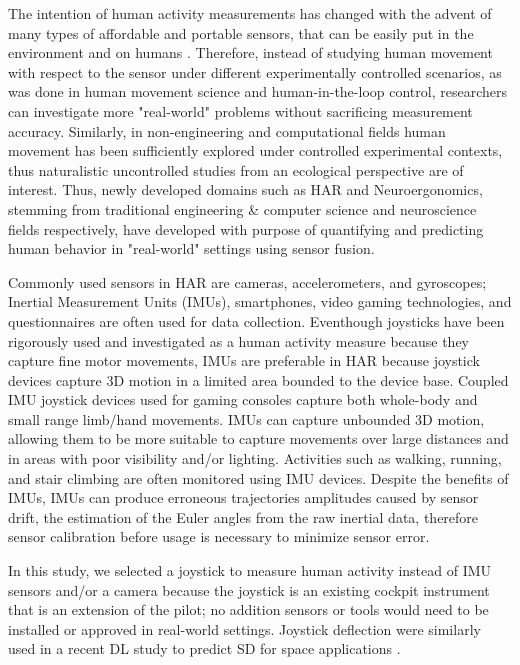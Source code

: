 \documentclass{ieeeaccess}
\begin{document}
The intention of human activity measurements has changed with the advent of many types of affordable and portable sensors, that can be easily put in the environment and on humans \cite{Fu_2020_Sensing}. Therefore, instead of studying human movement with respect to the sensor under different experimentally controlled scenarios, as was done in human movement science and human-in-the-loop control, researchers can investigate more "real-world" problems without sacrificing measurement accuracy. Similarly, in non-engineering and computational fields human movement has been sufficiently explored under controlled experimental contexts, thus naturalistic uncontrolled studies from an ecological perspective are of interest. Thus, newly developed domains such as HAR and Neuroergonomics, stemming from traditional engineering \& computer science and neuroscience fields respectively, have developed with purpose of quantifying and predicting human behavior in "real-world" settings using sensor fusion. 

Commonly used sensors in HAR are cameras, accelerometers, and gyroscopes; Inertial Measurement Units (IMUs), smartphones, video gaming technologies, and questionnaires are often used for data collection. Eventhough joysticks have been rigorously used and investigated as a human activity measure because they capture fine motor movements, IMUs are preferable in HAR because joystick devices capture 3D motion in a limited area bounded to the device base. Coupled IMU joystick devices used for gaming consoles capture both whole-body and small range limb/hand movements. IMUs can capture unbounded 3D motion, allowing them to be more suitable to capture movements over large distances and in areas with poor visibility and/or lighting. Activities such as walking, running, and stair climbing are often monitored using IMU devices. Despite the benefits of IMUs, IMUs can produce erroneous trajectories amplitudes caused by sensor drift, the estimation of the Euler angles from the raw inertial data, therefore sensor calibration before usage is necessary to minimize sensor error.

In this study, we selected a joystick to measure human activity
instead of IMU sensors and/or a camera because the joystick is an existing cockpit instrument that is an extension of the pilot; no addition sensors or tools would need to be installed or approved in real-world settings. Joystick deflection were similarly used in a recent DL study to predict SD for space applications \cite{Wang_2022_Crash}.  
\end{document}
